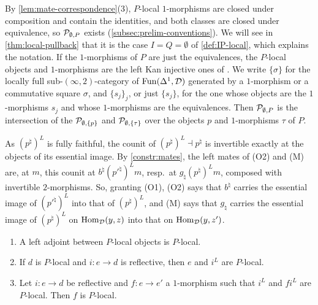 %
By \cref{lem:mate-correspondence}(3), $P$-local $1$-morphisms are closed under
composition and contain the identities, and both classes are closed under
equivalence, so $\mathcal{P}_{\emptyset,P}$ exists (\cref{subsec:prelim-conventions}).
We will see in \cref{thm:local-pullback} that it is the case $I = Q =
\emptyset$ of \cref{def:IP-local}, which explains the notation.
If the $1$-morphisms of
$P$ are just the equivalences, the $P$-local objects and $1$-morphisms are the
left Kan injective ones of \cite[Def.~1.2,
Rem.~1.3]{dilibertilobbiasousa2022kz}. We
write $\{\sigma\}$ for the locally full sub-$(\infty,2)$-category of
$\operatorname{Fun}(\Delta^{1},\mathcal{D})$ generated by a $1$-morphism or a commutative square
$\sigma$, and $\{s_{j}\}_{j}$, or just $\{s_{j}\}$,
for the one whose objects are the $1$-morphisms
$s_{j}$ and whose $1$-morphisms are the equivalences. Then $\mathcal{P}_{\emptyset,P}$
is the intersection of the
$\mathcal{P}_{\emptyset,\{p\}}$
and
$\mathcal{P}_{\emptyset,\{\tau\}}$
over the objects $p$ and $1$-morphisms $\tau$ of $P$.

%
As $(p^{\natural})^{L}$ is fully faithful, the counit of
$(p^{\natural})^{L} \dashv p^{\natural}$
is invertible exactly at the objects of its essential image. By
\cref{constr:mates}, the left mates of (O2) and (M) are, at $m$, this counit at
$b^{\natural}(p'^{\natural})^{L}m$,
resp.\ at
$g_{\natural}(p^{\natural})^{L}m$,
composed with invertible $2$-morphisms. So, granting (O1), (O2) says that
$b^{\natural}$ carries the essential image of $(p'^{\natural})^{L}$ into that of
$(p^{\natural})^{L}$, and (M) says that $g_{\natural}$ carries the essential
image of $(p^{\natural})^{L}$ on $\operatorname{Hom}_{\mathcal{D}}(y,z)$ into that on
$\operatorname{Hom}_{\mathcal{D}}(y,z')$.

\begin{lem}
\label{lem:laxloc-closure}
%
\leavevmode
\begin{enumerate}
\item A left adjoint between $P$-local objects is $P$-local.
\item If $d$ is $P$-local and $i\colon e \to d$ is reflective, then $e$ and
$i^{L}$ are $P$-local.
\item Let $i\colon e \to d$ be reflective and $f\colon e \to e'$ a $1$-morphism
such that $i^{L}$ and $fi^{L}$ are $P$-local. Then $f$ is $P$-local.
\end{enumerate}
\end{lem}


